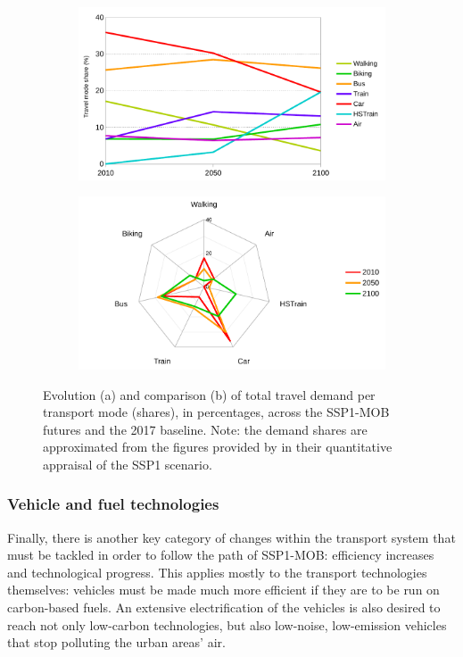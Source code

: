 \begin{figure}
		\centering
  \begin{subfigure}{0.8\textwidth}
    \includegraphics[width=\linewidth]{figures/line_travel-demand-shares.pdf}
    \caption{}
    \label{f:results:line_travel-demand-shares}
  \end{subfigure}
  \begin{subfigure}{0.8\textwidth}
    \includegraphics[width=\linewidth]{figures/radar_travel-demand-shares.pdf}
    \caption{}
    \label{f:results:radar_travel-demand-shares}
  \end{subfigure}
  \label{f:results:travel-demand-shares}
  \caption[Evolution and comparison of travel demand shares in SSP1-MOB.]{Evolution (a) and comparison (b) of total travel demand per transport mode (shares), in percentages, across the SSP1-MOB futures and the 2017 baseline. Note: the demand shares are approximated from the figures provided by \textcite{vuuren2017_Energylanduse} in their quantitative appraisal of the SSP1 scenario.}
\end{figure}

\subsubsection*{Vehicle and fuel technologies}
Finally, there is another key category of changes within the transport system that must be tackled in order to follow the path of SSP1-MOB: efficiency increases and technological progress. This applies mostly to the transport technologies themselves: vehicles must be made much more efficient if they are to be run on carbon-based fuels. An extensive electrification of the vehicles is also desired to reach not only low-carbon technologies, but also low-noise, low-emission vehicles that stop polluting the urban areas' air.

